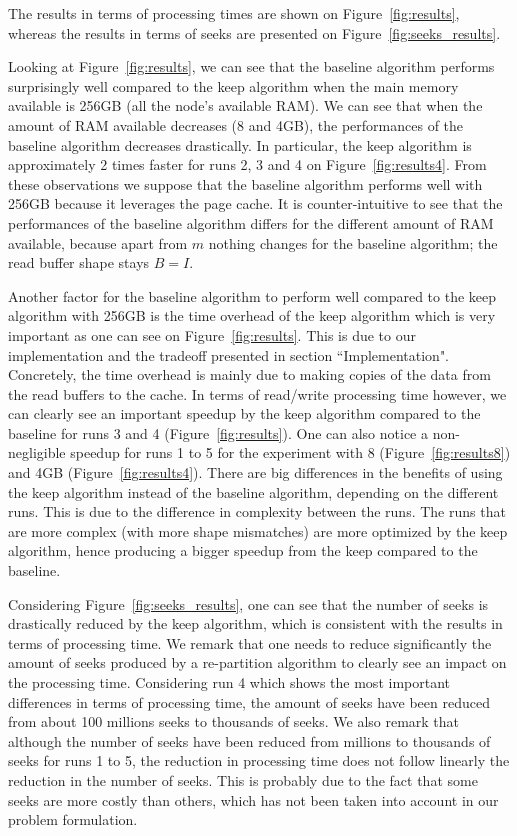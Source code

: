 \documentclass[sigconf, nonacm]{acmart}
\begin{document}
The results in terms of processing times are shown on
Figure~\ref{fig:results}, whereas the results in terms of seeks are
presented on Figure~\ref{fig:seeks_results}.

Looking at Figure~\ref{fig:results}, we can see that
the baseline algorithm performs surprisingly well compared to the keep algorithm
when the main memory available is 256GB (all the node's available RAM).
We can see that when the amount of RAM available decreases (8 and 4GB), the
performances of the baseline algorithm decreases drastically.
In particular, the keep algorithm is approximately 2 times faster for runs
2, 3 and 4 on Figure~\ref{fig:results4}.
From these observations we suppose that the baseline algorithm performs well
with 256GB because it leverages the page cache.
It is counter-intuitive to see that the performances of the baseline algorithm
differs for the different amount of RAM available, because apart from $m$
nothing changes for the baseline algorithm; the read buffer shape stays $B=I$.

Another factor for the baseline algorithm to perform well compared to the
keep algorithm with 256GB is the time overhead of the keep algorithm which is
very important as one can see on Figure~\ref{fig:results}.
This is due to our implementation and the tradeoff presented in section
``Implementation".
Concretely, the time overhead is mainly due to making copies of the data from
the read buffers to the cache.
In terms of read/write processing time however, we can clearly see an
important speedup by the keep algorithm compared to the baseline for
runs 3 and 4 (Figure~\ref{fig:results}).
One can also notice a non-negligible speedup for runs 1 to 5 for the experiment
with 8 (Figure~\ref{fig:results8}) and 4GB (Figure~\ref{fig:results4}).
There are big differences in the benefits of using the keep algorithm instead of
the baseline algorithm, depending on the different runs.
This is due to the difference in complexity between the runs.
The runs that are more complex (with more shape mismatches) are more optimized
by the keep algorithm, hence producing a bigger speedup from the keep compared to
the baseline.

Considering Figure~\ref{fig:seeks_results}, one can see that the number of
seeks is drastically reduced by the keep algorithm, which is consistent with
the results in terms of processing time.
We remark that one needs to reduce significantly the amount of seeks produced
by a re-partition algorithm to clearly see an impact on the processing time.
Considering run 4 which shows the most important differences in terms of
processing time, the amount of seeks have been reduced from about 100 millions
seeks to thousands of seeks.
We also remark that although the number of seeks have been reduced from millions
to thousands of seeks for runs 1 to 5, the reduction in processing time does not
follow linearly the reduction in the number of seeks.
This is probably due to the fact that some seeks are more costly than others,
which has not been taken into account in our problem formulation.
\end{document}
